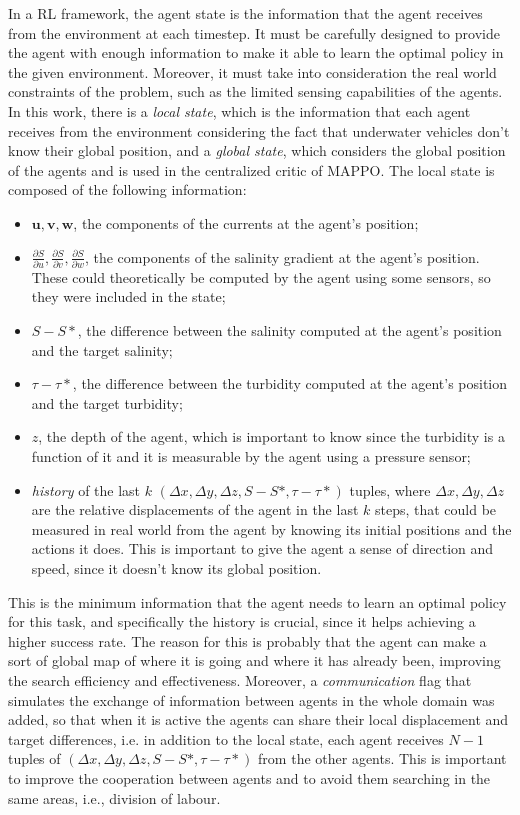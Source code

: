 In a RL framework, the agent state is the information that the agent receives from the environment at each timestep. 
It must be carefully designed to provide the agent with enough information to make it able to learn the optimal policy in 
the given environment. Moreover, it must take into consideration the real world constraints of the problem,
such as the limited sensing capabilities of the agents. In this work, there is a \textit{local state}, which is the information
that each agent receives from the environment considering the fact that underwater vehicles don't know their global position,
and a \textit{global state}, which considers the global position of the agents and is used in the centralized critic of MAPPO. The local state is composed of the following information:
\begin{itemize}
    \item $\mathbf{u},\mathbf{v},\mathbf{w}$, the components of the currents at the agent's position;
    \item $\frac{\partial S}{\partial u},\frac{\partial S}{\partial v},\frac{\partial S}{\partial w}$, the components of the salinity gradient at the agent's position. These could theoretically be computed by the agent using some sensors, so they were included in the state;
    \item $S - S*$, the difference between the salinity computed at the agent's position and the target salinity;
    \item $\tau - \tau*$, the difference between the turbidity computed at the agent's position and the target turbidity;
    \item $z$, the depth of the agent, which is important to know since the turbidity is a function of it and it is measurable by the agent using a pressure sensor;
    \item \textit{history} of the last $k$ $(\Delta x,\Delta y,\Delta z, S - S*, \tau - \tau*)$ tuples, where $\Delta x,\Delta y,\Delta z$ are the relative displacements of the agent in the last $k$ steps, that could be measured in real world from the agent by knowing its initial positions and the actions it does. This is important to give the agent a sense of direction and speed, since it doesn't know its global position.
\end{itemize}

This is the minimum information that the agent needs to learn an optimal policy for this task,
and specifically the history is crucial, since it helps achieving a higher success rate. The reason for this is probably
that the agent can make a sort of global map of where it is going and where it has already been, improving the search efficiency
and effectiveness. Moreover, a \textit{communication} flag that simulates the exchange of information between agents
in the whole domain was added, so that when it is active the agents can share their local displacement and target differences, i.e. in addition 
to the local state, each agent receives $N-1$ tuples of $(\Delta x,\Delta y,\Delta z, S - S*, \tau - \tau*)$ from the other agents. 
This is important to improve the cooperation between agents and to avoid them searching in the same areas, i.e., division of labour.

